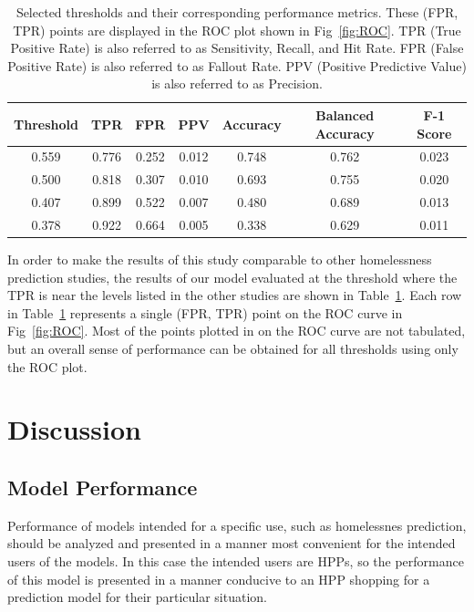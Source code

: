 \documentclass[10pt,letterpaper]{article}
\begin{document}
\begin{table}[htb]
    \centering
    \begin{tabular}{ccccccc}
        \toprule
        Threshold   &   TPR &   FPR & PPV   & Accuracy  &  Balanced Accuracy    & F-1 Score \\
        \midrule
        0.559       & 0.776 & 0.252 & 0.012 &     0.748 &     0.762             & 0.023 \\
        0.500       & 0.818 & 0.307 & 0.010 &     0.693 &     0.755             & 0.020 \\
        0.407       & 0.899 & 0.522 & 0.007 &     0.480 &     0.689             & 0.013 \\
        0.378       & 0.922 & 0.664 & 0.005 &     0.338 &     0.629             & 0.011 \\
        \bottomrule
    \end{tabular}
    \caption{Selected thresholds and their corresponding performance metrics. These (FPR, TPR) points are displayed in the ROC plot shown in Fig~\ref{fig:ROC}. TPR (True Positive Rate) is also referred to as Sensitivity, Recall, and Hit Rate. FPR (False Positive Rate) is also referred to as Fallout Rate. PPV (Positive Predictive Value) is also referred to as Precision.}
    \label{tbl:performance}
\end{table}

In order to make the results of this study comparable to other homelessness prediction studies, the results of our model evaluated at the threshold where the TPR is near the levels listed in the other studies are shown in Table~\ref{tbl:performance}. Each row in Table~\ref{tbl:performance} represents a single (FPR, TPR) point on the ROC curve in Fig~\ref{fig:ROC}. Most of the points plotted in on the ROC curve are not tabulated, but an overall sense of performance can be obtained for all thresholds using only the ROC plot.

\section*{Discussion}
\subsection*{Model Performance}
Performance of models intended for a specific use, such as homelessnes prediction, should be analyzed and presented in a manner most convenient for the intended users of the models. In this case the intended users are HPPs, so the performance of this model is presented in a manner conducive to an HPP shopping for a prediction model for their particular situation.
\end{document}
